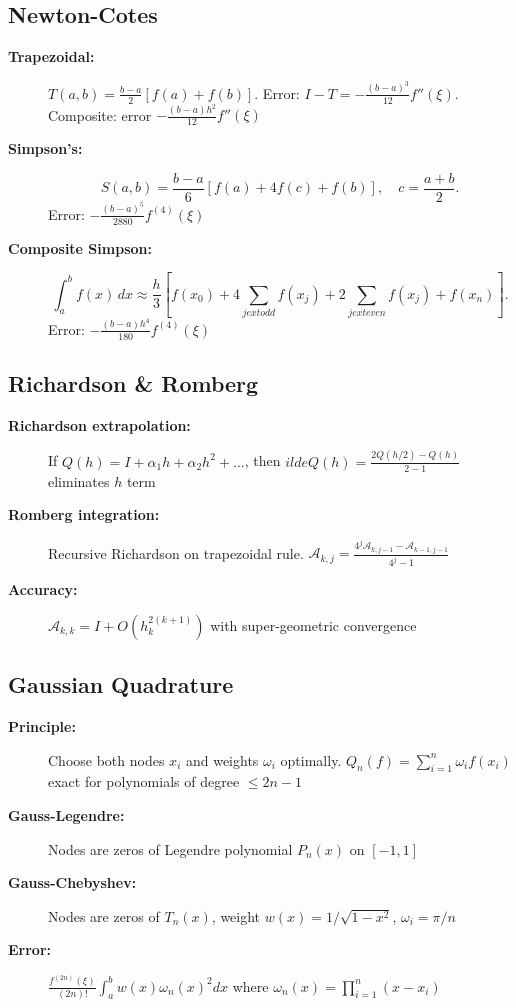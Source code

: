 \documentclass[a4paper,10pt,landscape]{article}
\begin{document}
\begin{multicols*}{3}
    \subsection*{Newton-Cotes}
    \begin{description}
        \item[\textbf{Trapezoidal:}] $T(a,b) = \frac{b-a}{2}[f(a)+f(b)]$. Error: $I-T = -\frac{(b-a)^3}{12}f''(\xi)$. Composite: error $-\frac{(b-a)h^2}{12}f''(\xi)$
        \item[\textbf{Simpson's:}]
              \[S(a,b) = \frac{b-a}{6}[f(a) + 4f(c) + f(b)], \quad c=\frac{a+b}{2}.\]
              Error: $-\frac{(b-a)^5}{2880}f^{(4)}(\xi)$
        \item[\textbf{Composite Simpson:}]
              \[\int_a^b f(x)\,dx \approx \frac{h}{3}\left[f(x_0) + 4\sum_{j	ext{ odd}}f(x_j) + 2\sum_{j	ext{ even}}f(x_j) + f(x_n)\right].\]
              Error: $-\frac{(b-a)h^4}{180}f^{(4)}(\xi)$
    \end{description}

    \subsection*{Richardson \& Romberg}
    \begin{description}
        \item[\textbf{Richardson extrapolation:}] If $Q(h) = I + \alpha_1 h + \alpha_2 h^2 + \ldots$, then $	ilde{Q}(h) = \frac{2Q(h/2) - Q(h)}{2-1}$ eliminates $h$ term
        \item[\textbf{Romberg integration:}] Recursive Richardson on trapezoidal rule. $\mathcal{A}_{k,j} = \frac{4^j \mathcal{A}_{k,j-1} - \mathcal{A}_{k-1,j-1}}{4^j - 1}$
        \item[\textbf{Accuracy:}] $\mathcal{A}_{k,k} = I + O(h_k^{2(k+1)})$ with super-geometric convergence
    \end{description}

    \subsection*{Gaussian Quadrature}
    \begin{description}
        \item[\textbf{Principle:}] Choose both nodes $x_i$ and weights $\omega_i$ optimally. $Q_n(f) = \sum_{i=1}^n \omega_i f(x_i)$ exact for polynomials of degree $\leq 2n-1$
        \item[\textbf{Gauss-Legendre:}] Nodes are zeros of Legendre polynomial $P_n(x)$ on $[-1,1]$
        \item[\textbf{Gauss-Chebyshev:}] Nodes are zeros of $T_n(x)$, weight $w(x) = 1/\sqrt{1-x^2}$, $\omega_i = \pi/n$
        \item[\textbf{Error:}] $\frac{f^{(2n)}(\xi)}{(2n)!}\int_a^b w(x)\omega_n(x)^2 dx$ where $\omega_n(x) = \prod_{i=1}^n(x-x_i)$
    \end{description}


\end{multicols*}
\end{document}
